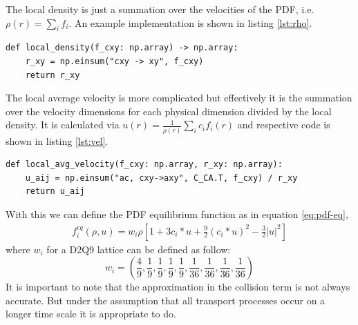 \documentclass[a4paper,11pt]{article}
\begin{document}
The local density is just a summation over the velocities of the PDF, i.e. $\rho(r) = \sum_{i} f_{i}$.
An example implementation is shown in listing \ref{lst:rho}.
\begin{center}
\begin{lstlisting}[caption=Implementation of the local density,label=lst:rho, basicstyle=\small]
def local_density(f_cxy: np.array) -> np.array:
    r_xy = np.einsum("cxy -> xy", f_cxy)
    return r_xy
  \end{lstlisting}
\end{center}
The local average velocity is more complicated but effectively it is the summation over the velocity dimensions for each physical dimension divided by the local density.
It is calculated via $u(r)=\frac{1}{\rho (r)} \sum_{i} c_{i}f_{i}(r)$ and respective code is shown in listing \ref{lst:vel}.
\begin{center}
  \begin{lstlisting}[caption=Implementation of the local average velocity.,label=lst:vel, basicstyle=\small]
def local_avg_velocity(f_cxy: np.array, r_xy: np.array):
    u_aij = np.einsum("ac, cxy->axy", C_CA.T, f_cxy) / r_xy
    return u_aij
  \end{lstlisting}
\end{center}
With this we can define the PDF equilibrium function as in equation \ref{eq:pdf-eq},
\begin{equation}
  \label{eq:pdf-eq}
  \begin{aligned}
    f_{i}^{eq} ( \rho , u ) = w_i \rho \left[ 1+3 c_i * u + \frac{9}{2}(c_i * u )^2 - \frac{3}{2} | u |^2 \right]
  \end{aligned}
\end{equation}
where $w_i$ for a D2Q9 lattice can be defined as follow: 
\begin{equation}
w_i = \left( \frac{4}{9}, \frac{1}{9}, \frac{1}{9}, \frac{1}{9}, \frac{1}{9}, \frac{1}{36}, \frac{1}{36}, \frac{1}{36}, \frac{1}{36} \right)
\end{equation}
It is important to note that the approximation in the collision term is not always accurate.
But under the assumption that all transport processes occur on a longer time scale it is appropriate to do.
\end{document}
